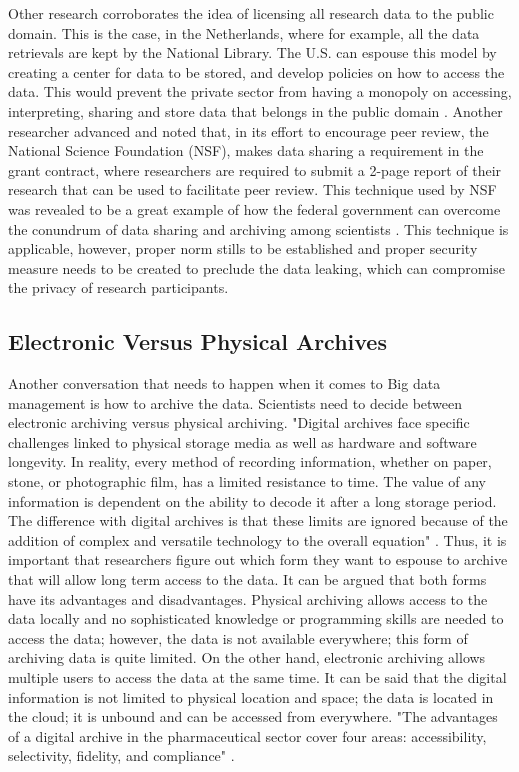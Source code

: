 \documentclass[sigconf]{acmart}
\begin{document}
Other research corroborates the idea of licensing all research data to the public domain. This is the case, in the Netherlands, where for example, all the data retrievals are kept by the National Library. The U.S. can espouse this model by creating a center for data to be stored, and develop policies on how to access the data. This would prevent the private sector from having a monopoly on accessing, interpreting, sharing and store data that belongs in the public domain \cite{sarkol2016scientific}.  Another researcher advanced and noted that, in its effort to encourage peer review, the National Science Foundation (NSF), makes data sharing a requirement in the grant contract, where researchers are required to submit a 2-page report of their research that can be used to facilitate peer review. This technique used by NSF was revealed to be a great example of how the federal government can overcome the conundrum of data sharing and archiving among scientists \cite{borgman2012conundrum}. This technique is applicable, however, proper norm stills to be established and proper security measure needs to be created to preclude the data leaking, which can compromise the privacy of research participants.


\subsection{Electronic Versus Physical Archives}


Another conversation that needs to happen when it comes to Big data management is how to archive the data. Scientists need to decide between electronic archiving versus physical archiving. "Digital archives face specific challenges linked to physical storage media as well as hardware and software longevity. In reality, every method of recording information, whether on paper, stone, or photographic film, has a limited resistance to time. The value of any information is dependent on the ability to decode it after a long storage period. The difference with digital archives is that these limits are ignored because of the addition of complex and versatile technology to the overall equation" \cite{stamatiadis2005digital}. Thus, it is important that researchers figure out which form they want to espouse to archive that will allow long term access to the data. It can be argued that both forms have its advantages and disadvantages. Physical archiving allows access to the data locally and no sophisticated knowledge or programming skills are needed to access the data; however, the data is not available everywhere; this form of archiving data is quite limited. On the other hand, electronic archiving allows multiple users to access the data at the same time. It can be said that the digital information is not limited to physical location and space; the data is located in the cloud; it is unbound and can be accessed from everywhere. "The advantages of a digital archive in the pharmaceutical sector cover four areas: accessibility, selectivity, fidelity, and compliance" \cite{stamatiadis2005digital}.
\end{document}

